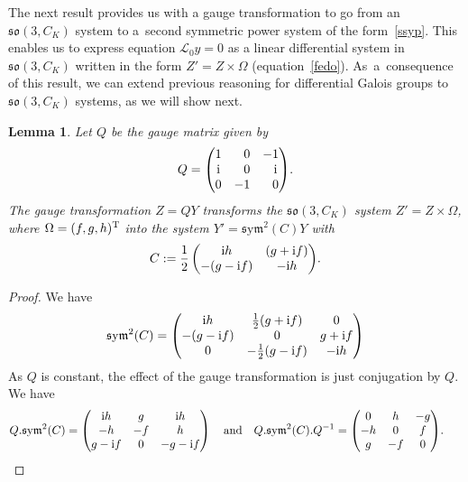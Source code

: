 \documentclass[pdftex]{sigma}%
\numberwithin{equation}{section}
\newtheorem{Lemma}[Theorem]{Lemma}
\def\sym{\mathfrak{s}\mathrm{y}\mathfrak{m}}
\begin{document}
The next result provides us with a gauge transformation to go from an $\mathfrak{so}(3, C_K)$ system
to a~second symmetric power system of the form~\eqref{ssyp}. This enables us to express equation $\mathcal L_0y=0$ as a linear differential system in $\mathfrak{so}(3, C_K)$ written in the form $Z'= Z \times \Omega$ (equation~\eqref{fedo}). As~a~consequence of this result, we can extend previous reasoning for differential Galois groups to $\mathfrak{so}(3, C_K)$ systems, as we will show next.

\begin{Lemma}\label{gaugemat}
Let $Q$ be the gauge matrix given by
\begin{gather}\label{eq:gauge sltoso3}
 Q=
 \begin{pmatrix}
 	1&\hphantom{-}0&-1\\ {\rm i}&\hphantom{-}0&\hphantom{-}{\rm i}
\\ 0&-1&\hphantom{-}0
	\end{pmatrix}\!.
\end{gather}
The gauge transformation $Z=QY$ transforms the $\mathfrak{so}(3, C_K)$ system $Z'= Z \times \Omega$, where $\Omega=(f,g,h)^{\rm T}$ into the system $Y'=\sym^2(C)Y$
with
\begin{gather*}
C:= \frac{1}{2} \begin{pmatrix} {\rm i} h & (g +{\rm i}f ) \\
	 - (g - {\rm i}f ) & - {\rm i} h \end{pmatrix}\!.
\end{gather*}
\end{Lemma}

\begin{proof}
We have
\begin{gather*} \sym^2(C) = \begin{pmatrix}
{\rm i}h &\frac12(g +{\rm i} f) &0\\ -(g-{\rm i}f) &0&g+{\rm i}f \\ 0&-\frac12(g -{\rm i} f) &-{\rm i}h \end{pmatrix}
\end{gather*}
As $Q$ is constant, the effect of the gauge transformation is just conjugation by $Q$.
We have
\begin{gather*}
Q.\sym^2(C) = \begin{pmatrix}
{\rm i}h &g &{\rm i}
h \\ -h &-f
 &h \\ g -{\rm i}f &0&-g -{\rm i}f \end{pmatrix}
\quad \textrm{and} \quad
Q.\sym^2(C).Q^{-1} =\begin{pmatrix} 0&h &-g
\\ -h &0&f
\\ g &-f &0
\end{pmatrix}\!.\!\!\!\tag*{\qed}
\end{gather*}
\renewcommand{\qed}{}
\end{proof}
\end{document}
